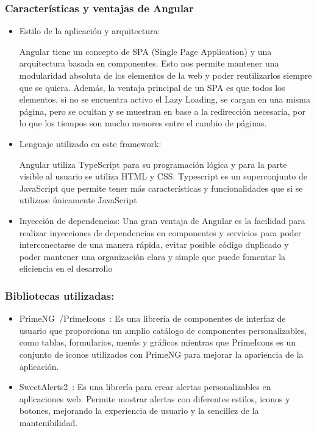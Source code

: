  
 \subsubsection{Características y ventajas de Angular}

 \begin{itemize}
     \item Estilo de la aplicación y arquitectura: 

     Angular tiene un concepto de SPA (Single Page Application) y una arquitectura basada en componentes. Esto nos permite mantener una modularidad absoluta de los elementos de la web y poder reutilizarlos siempre que se quiera. Además, la ventaja principal de un SPA es que todos los elementos, si no se encuentra activo el Lazy Loading, se cargan en una misma página, pero se ocultan y se muestran en base a la redirección necesaria, por lo que los tiempos son mucho menores entre el cambio de páginas.

     \item Lenguaje utilizado en este framework:
     
     Angular utiliza TypeScript para su programación lógica y para la parte visible al usuario se utiliza HTML y CSS. Typescript es un superconjunto de JavaScript que permite tener más características y funcionalidades que si se utilizase únicamente JavaScript

     \item Inyección de dependencias:
    Una gran ventaja de Angular es la facilidad para realizar inyecciones de dependencias en componentes y servicios para poder interconectarse de una manera rápida, evitar posible código duplicado y poder mantener una organización clara y simple que puede fomentar la eficiencia en el desarrollo
     
 \end{itemize}

 \subsubsection{Bibliotecas utilizadas:}
 \begin{itemize}
     \item PrimeNG~\cite{PrimeNG}/PrimeIcons~\cite{PrimeIcons}:
     Es una librería de componentes de interfaz de usuario que proporciona un amplio catálogo de componentes personalizables, como tablas, formularios, menús y gráficos mientras que PrimeIcons es un conjunto de iconos utilizados con PrimeNG para mejorar la apariencia de la aplicación.

  
     \item SweetAlerts2~\cite{SweetAlert2}: Es una librería  para crear alertas personalizables en aplicaciones web. Permite mostrar alertas con diferentes estilos, iconos y botones, mejorando la experiencia de usuario y la sencillez de la mantenibilidad.
 \end{itemize}
 


